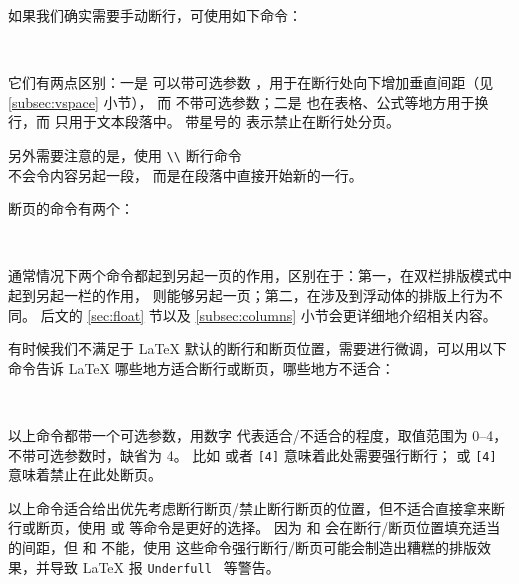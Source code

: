  
如果我们确实需要手动断行，可使用如下命令：
\begin{command}
\crcmd {} \qquad
\crcmd*{} \\
\end{command}

它们有两点区别：一是 \crcmd{} 可以带可选参数 ，用于在断行处向下增加垂直间距（见 \ref{subsec:vspace} 小节），
而  不带可选参数；二是 \crcmd{} 也在表格、公式等地方用于换行，而  只用于文本段落中。
带星号的 \crcmd{} 表示禁止在断行处分页。

\begin{example}
另外需要注意的是，使用 \verb|\\|
断行命令 \\ 不会令内容另起一段，
而是在段落中直接开始新的一行。
\end{example}

断页的命令有两个：
\begin{command}
 \\
\end{command}

通常情况下两个命令都起到另起一页的作用，区别在于：第一，在双栏排版模式中  起到另起一栏的作用， 则能够另起一页；第二，在涉及到浮动体的排版上行为不同。
后文的 \ref{sec:float} 节以及 \ref{subsec:columns} 小节会更详细地介绍相关内容。

有时候我们不满足于 \LaTeX{} 默认的断行和断页位置，需要进行微调，可以用以下命令告诉 \LaTeX{} 哪些地方适合断行或断页，哪些地方不适合：
\begin{command}
 \quad {} \\
 \quad {}
\end{command}

以上命令都带一个可选参数，用数字  代表适合/不适合的程度，取值范围为 0--4，不带可选参数时，缺省为 4。
比如  或者 \texttt{[4]} 意味着此处需要强行断行； 或 \texttt{[4]}
意味着禁止在此处断页。

以上命令适合给出优先考虑断行断页/禁止断行断页的位置，但不适合直接拿来断行或断页，使用  或  等命令是更好的选择。
因为  和  会在断行/断页位置填充适当的间距，但  和  不能，使用
这些命令强行断行/断页可能会制造出糟糕的排版效果，并导致 \LaTeX{} 报 \texttt{Underfull } 等警告。

